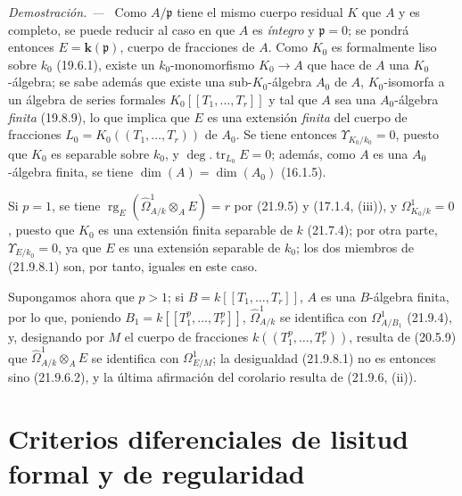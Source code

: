 \documentclass[10pt,oneside]{book}
\newenvironment{proof}{%
  \par\medskip\noindent\textit{Demostración. ---\ }}{\par}
\begin{document}
\begin{proof}
Como $A/\mathfrak p$ tiene el mismo cuerpo residual $K$ que $A$ y es completo,
se puede reducir al caso en que $A$ es \emph{íntegro} y $\mathfrak p=0$; se pondrá
entonces $E=\boldsymbol{k}(\mathfrak p)$, cuerpo de fracciones de $A$. Como $K_0$ es
formalmente liso sobre $k_0$ (19.6.1), existe un $k_0$-monomorfismo
$K_0\to A$ que hace de $A$ una $K_0$-álgebra; se sabe además que existe una
sub-$K_0$-álgebra $A_0$ de $A$, $K_0$-isomorfa a un álgebra de series formales
$K_0[[T_1,\ldots,T_r]]$ y tal que $A$ sea una $A_0$-álgebra \emph{finita}
(19.8.9), lo que implica que $E$ es una extensión \emph{finita} del cuerpo de
fracciones $L_0=K_0((T_1,\ldots,T_r))$ de $A_0$. Se tiene entonces
$\Upsilon_{K_0/k_0}=0$, puesto que $K_0$ es separable sobre $k_0$, y
$\deg.\operatorname{tr}_{L_0}E=0$; además, como $A$ es una $A_0$-álgebra
finita, se tiene $\dim(A)=\dim(A_0)$ (16.1.5).

Si $p=1$, se tiene
$\operatorname{rg}_E(\widehat\Omega^1_{A/k}\otimes_AE)=r$ por (21.9.5) y
(17.1.4, (iii)), y $\Omega^1_{K_0/k}=0$, puesto que $K_0$ es una extensión
finita separable de $k$ (21.7.4); por otra parte,
$\Upsilon_{E/k_0}=0$, ya que $E$ es una extensión separable de $k_0$; los dos
miembros de (21.9.8.1) son, por tanto, iguales en este caso.

Supongamos ahora que $p>1$; si $B=k[[T_1,\ldots,T_r]]$, $A$ es una
$B$-álgebra finita, por lo que, poniendo
$B_1=k[[T_1^p,\ldots,T_r^p]]$, $\widehat\Omega^1_{A/k}$ se identifica con
$\Omega^1_{A/B_1}$ (21.9.4), y, designando por $M$ el cuerpo de fracciones
$k((T_1^p,\ldots,T_r^p))$, resulta de (20.5.9) que
$\widehat\Omega^1_{A/k}\otimes_AE$ se identifica con $\Omega^1_{E/M}$; la
desigualdad (21.9.8.1) no es entonces sino (21.9.6.2), y la última afirmación
del corolario resulta de (21.9.6, (ii)).
\end{proof}

\section{Criterios diferenciales de lisitud formal y de regularidad}
\label{section:0.22-es}
\end{document}
